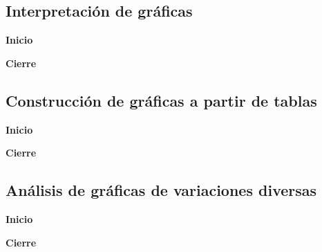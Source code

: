 \documentclass[11pt]{book}
\begin{document}
\subsection{Interpretación de gr\'aficas}

\begin{boxK}
  \begin{center}\textbf{Inicio}\end{center}

\end{boxK}

\begin{boxK}
  \begin{center}\textbf{Cierre}\end{center}

\end{boxK}

\subsection{Construcción de gr\'aficas a partir de tablas}

\begin{boxK}
  \begin{center}\textbf{Inicio}\end{center}

\end{boxK}

\begin{boxK}
  \begin{center}\textbf{Cierre}\end{center}

\end{boxK}

\subsection{Análisis de gr\'aficas de variaciones diversas}

\begin{boxK}
  \begin{center}\textbf{Inicio}\end{center}

\end{boxK}

\begin{boxK}
  \begin{center}\textbf{Cierre}\end{center}

\end{boxK}
\end{document}
